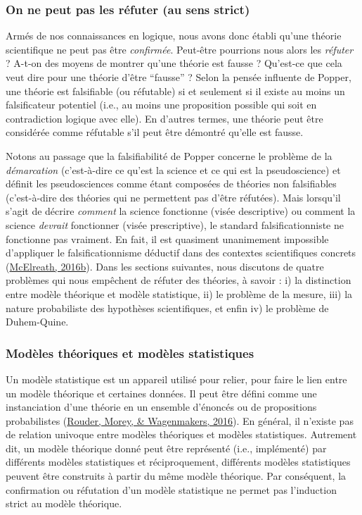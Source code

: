 \documentclass[
  a4paper,11pt,twoside,onecolumn,openright,final,oldfontcommands]{memoir}
\theoremstyle{definition}
\theoremstyle{definition}
\theoremstyle{definition}
\theoremstyle{remark}
\begin{document}
\hypertarget{on-ne-peut-pas-les-ruxe9futer-au-sens-strict}{%
\subsubsection{On ne peut pas les réfuter (au sens strict)}\label{on-ne-peut-pas-les-ruxe9futer-au-sens-strict}}

Armés de nos connaissances en logique, nous avons donc établi qu'une théorie scientifique ne peut pas être \emph{confirmée}. Peut-être pourrions nous alors les \emph{réfuter} ? A-t-on des moyens de montrer qu'une théorie est fausse ? Qu'est-ce que cela veut dire pour une théorie d'être ``fausse'' ? Selon la pensée influente de Popper, une théorie est falsifiable (ou réfutable) si et seulement si il existe au moins un falsificateur potentiel (i.e., au moins une proposition possible qui soit en contradiction logique avec elle). En d'autres termes, une théorie peut être considérée comme réfutable s'il peut être démontré qu'elle est fausse.

Notons au passage que la falsifiabilité de Popper concerne le problème de la \emph{démarcation} (c'est-à-dire ce qu'est la science et ce qui est la pseudoscience) et définit les pseudosciences comme étant composées de théories non falsifiables (c'est-à-dire des théories qui ne permettent pas d'être réfutées). Mais lorsqu'il s'agit de décrire \emph{comment} la science fonctionne (visée descriptive) ou comment la science \emph{devrait} fonctionner (visée prescriptive), le standard falsificationniste ne fonctionne pas vraiment. En fait, il est quasiment unanimement impossible d'appliquer le falsificationnisme déductif dans des contextes scientifiques concrets (\protect\hyperlink{ref-mcelreath_statistical_2016}{McElreath, 2016b}). Dans les sections suivantes, nous discutons de quatre problèmes qui nous empêchent de réfuter des théories, à savoir : i) la distinction entre modèle théorique et modèle statistique, ii) le problème de la mesure, iii) la nature probabiliste des hypothèses scientifiques, et enfin iv) le problème de Duhem-Quine.

\hypertarget{moduxe8les-thuxe9oriques-et-moduxe8les-statistiques}{%
\subsubsection{Modèles théoriques et modèles statistiques}\label{moduxe8les-thuxe9oriques-et-moduxe8les-statistiques}}

Un modèle statistique est un appareil utilisé pour relier, pour faire le lien entre un modèle théorique et certaines données. Il peut être défini comme une instanciation d'une théorie en un ensemble d'énoncés ou de propositions probabilistes (\protect\hyperlink{ref-rouder_interplay_2016}{Rouder, Morey, \& Wagenmakers, 2016}). En général, il n'existe pas de relation univoque entre modèles théoriques et modèles statistiques. Autrement dit, un modèle théorique donné peut être représenté (i.e., implémenté) par différents modèles statistiques et réciproquement, différents modèles statistiques peuvent être construits à partir du même modèle théorique. Par conséquent, la confirmation ou réfutation d'un modèle statistique ne permet pas l'induction strict au modèle théorique.
\end{document}
